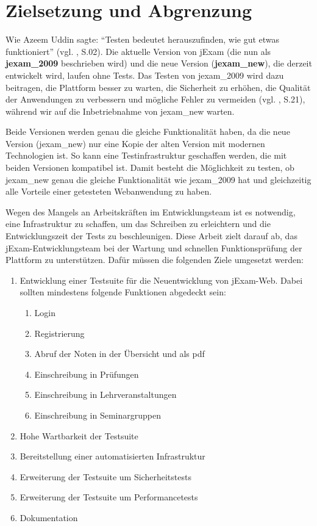 
\section{Zielsetzung und Abgrenzung}


Wie Azeem Uddin  sagte: ``Testen bedeutet herauszufinden, wie gut etwas funktioniert'' (vgl. \cite{anand12importance}, S.02).
Die aktuelle Version von jExam (die nun als \textbf{\gls{jexam_2009}} beschrieben wird) und die neue Version (\textbf{\Gls{jexam_new}}),
die derzeit entwickelt wird, laufen ohne Tests. Das Testen von \gls{jexam_2009} wird dazu beitragen, die Plattform
besser zu warten, die Sicherheit zu erhöhen, die Qualität der Anwendungen zu verbessern und mögliche Fehler zu
vermeiden (vgl. \cite{shultz2011software}, S.21), während wir auf die Inbetriebnahme von \Gls{jexam_new} warten.


Beide Versionen werden genau die gleiche Funktionalität haben, da die neue Version (\Gls{jexam_new}) nur eine Kopie der
alten Version mit modernen Technologien ist. So kann eine Testinfrastruktur geschaffen werden, die mit beiden Versionen
kompatibel ist. Damit besteht die Möglichkeit zu testen, ob \gls{jexam_new} genau die gleiche Funktionalität wie
\gls{jexam_2009} hat und gleichzeitig alle Vorteile einer
getesteten Webanwendung zu haben.

Wegen des Mangels an Arbeitskräften im Entwicklungsteam ist es notwendig,
eine Infrastruktur zu schaffen, um das Schreiben zu erleichtern und die
Entwicklungszeit der Tests zu beschleunigen. Diese Arbeit zielt darauf ab,
das jExam-Entwicklungsteam bei der Wartung und schnellen Funktionsprüfung der
Plattform zu unterstützen. Dafür müssen die folgenden Ziele umgesetzt werden:


\begin{enumerate}
    \item Entwicklung einer Testsuite für die Neuentwicklung von jExam-Web.
    Dabei sollten mindestens folgende Funktionen abgedeckt sein:
    \begin{enumerate}
        \item Login
        \item Registrierung
        \item Abruf der Noten in der Übersicht und als pdf
        \item Einschreibung in Prüfungen
        \item Einschreibung in Lehrveranstaltungen
        \item Einschreibung in Seminargruppen
    \end{enumerate}
    \item Hohe Wartbarkeit der Testsuite
    \item Bereitstellung einer automatisierten Infrastruktur
    \item Erweiterung der Testsuite um Sicherheitstests
    \item Erweiterung der Testsuite um Performancetests
    \item Dokumentation
\end{enumerate}
